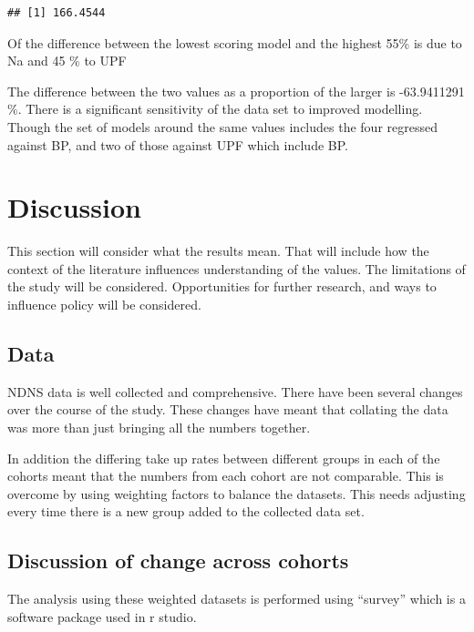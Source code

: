 \documentclass[
]{article}
\begin{document}
\begin{verbatim}
## [1] 166.4544
\end{verbatim}

Of the difference between the lowest scoring model and the highest 55\%
is due to Na and 45 \% to UPF

The difference between the two values as a proportion of the larger is
-63.9411291 \%. There is a significant sensitivity of the data set to
improved modelling. Though the set of models around the same values
includes the four regressed against BP, and two of those against UPF
which include BP.

\newpage

\hypertarget{discussion}{%
\section{Discussion}\label{discussion}}

This section will consider what the results mean. That will include how
the context of the literature influences understanding of the values.
The limitations of the study will be considered. Opportunities for
further research, and ways to influence policy will be considered.

\hypertarget{data}{%
\subsection{Data}\label{data}}

NDNS data is well collected and comprehensive. There have been several
changes over the course of the study. These changes have meant that
collating the data was more than just bringing all the numbers together.

In addition the differing take up rates between different groups in each
of the cohorts meant that the numbers from each cohort are not
comparable. This is overcome by using weighting factors to balance the
datasets. This needs adjusting every time there is a new group added to
the collected data set.

\hypertarget{discussion-of-change-across-cohorts}{%
\subsection{Discussion of change across
cohorts}\label{discussion-of-change-across-cohorts}}

The analysis using these weighted datasets is performed using ``survey''
which is a software package used in r studio.
\end{document}
